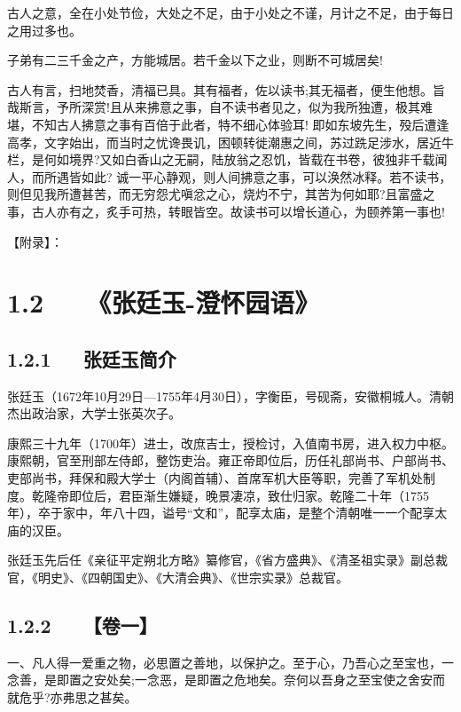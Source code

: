 \documentclass[letterpaper,12pt,english]{sphinxmanual}
\begin{document}
古人之意，全在小处节俭，大处之不足，由于小处之不谨，月计之不足，由于每日之用过多也。

子弟有二三千金之产，方能城居。若千金以下之业，则断不可城居矣!

古人有言，扫地焚香，清福已具。其有福者，佐以读书;其无福者，便生他想。旨哉斯言，予所深赏!且从来拂意之事，自不读书者见之，似为我所独遭，极其难堪，不知古人拂意之事有百倍于此者，特不细心体验耳! 即如东坡先生，殁后遭逢高孝，文字始出，而当时之忧谗畏讥，困顿转徙潮惠之间，苏过跣足涉水，居近牛栏，是何如境界?又如白香山之无嗣，陆放翁之忍饥，皆载在书卷，彼独非千载闻人，而所遇皆如此? 诚一平心静观，则人间拂意之事，可以涣然冰释。若不读书，则但见我所遭甚苦，而无穷怨尤嗔忿之心，烧灼不宁，其苦为何如耶?且富盛之事，古人亦有之，炙手可热，转眼皆空。故读书可以增长道心，为颐养第一事也!

【附录】：


\section{1.2   《张廷玉-澄怀园语》}
\label{\detokenize{p00_u5176_u5b83/_u300a_u5f20_u82f1-_u806a_u8bad_u658b_u8bed_u300b_u300a_u5f20_u5ef7_u7389-_u6f84_u6000_u56ed_u8bed_u300b_u5408_u8f91:id7}}

\subsection{1.2.1   张廷玉简介}
\label{\detokenize{p00_u5176_u5b83/_u300a_u5f20_u82f1-_u806a_u8bad_u658b_u8bed_u300b_u300a_u5f20_u5ef7_u7389-_u6f84_u6000_u56ed_u8bed_u300b_u5408_u8f91:id8}}
张廷玉（1672年10月29日—1755年4月30日），字衡臣，号砚斋，安徽桐城人。清朝杰出政治家，大学士张英次子。

康熙三十九年（1700年）进士，改庶吉士，授检讨，入值南书房，进入权力中枢。康熙朝，官至刑部左侍郎，整饬吏治。雍正帝即位后，历任礼部尚书、户部尚书、吏部尚书，拜保和殿大学士（内阁首辅）、首席军机大臣等职，完善了军机处制度。乾隆帝即位后，君臣渐生嫌疑，晚景凄凉，致仕归家。乾隆二十年（1755年），卒于家中，年八十四，谥号“文和”，配享太庙，是整个清朝唯一一个配享太庙的汉臣。

张廷玉先后任《亲征平定朔北方略》纂修官，《省方盛典》、《清圣祖实录》副总裁官，《明史》、《四朝国史》、《大清会典》、《世宗实录》总裁官。


\subsection{1.2.2   【卷一】}
\label{\detokenize{p00_u5176_u5b83/_u300a_u5f20_u82f1-_u806a_u8bad_u658b_u8bed_u300b_u300a_u5f20_u5ef7_u7389-_u6f84_u6000_u56ed_u8bed_u300b_u5408_u8f91:id9}}
一、凡人得一爱重之物，必思置之善地，以保护之。至于心，乃吾心之至宝也，一念善，是即置之安处矣;一念恶，是即置之危地矣。奈何以吾身之至宝使之舍安而就危乎?亦弗思之甚矣。
\end{document}
